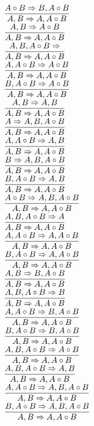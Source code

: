 \documentclass[11pt]{article}
\begin{document}
\begin{center}
\bigskip
\\$\infer{A, B\Rightarrow A, A\circ B}{A\circ B\Rightarrow B, A\circ B}$
\bigskip
\\$\infer{A, B\Rightarrow A, A\circ B}{A, B\Rightarrow A\circ B}$
\bigskip
\\$\infer{A, B\Rightarrow A, A\circ B}{A, B, A\circ B\Rightarrow }$
\bigskip
\\$\infer{A, B\Rightarrow A, A\circ B}{A, A\circ B\Rightarrow A\circ B}$
\bigskip
\\$\infer{A, B\Rightarrow A, A\circ B}{B, A\circ B\Rightarrow A\circ B}$
\bigskip
\\$\infer{A, B\Rightarrow A, A\circ B}{A, B\Rightarrow A, B}$
\bigskip
\\$\infer{A, B\Rightarrow A, A\circ B}{A\Rightarrow A, B, A\circ B}$
\bigskip
\\$\infer{A, B\Rightarrow A, A\circ B}{A, A\circ B\Rightarrow A, B}$
\bigskip
\\$\infer{A, B\Rightarrow A, A\circ B}{B\Rightarrow A, B, A\circ B}$
\bigskip
\\$\infer{A, B\Rightarrow A, A\circ B}{B, A\circ B\Rightarrow A, B}$
\bigskip
\\$\infer{A, B\Rightarrow A, A\circ B}{A\circ B\Rightarrow A, B, A\circ B}$
\bigskip
\\$\infer{A, B\Rightarrow A, A\circ B}{A, B, A\circ B\Rightarrow A}$
\bigskip
\\$\infer{A, B\Rightarrow A, A\circ B}{A, A\circ B\Rightarrow A, A\circ B}$
\bigskip
\\$\infer{A, B\Rightarrow A, A\circ B}{B, A\circ B\Rightarrow A, A\circ B}$
\bigskip
\\$\infer{A, B\Rightarrow A, A\circ B}{A, B\Rightarrow B, A\circ B}$
\bigskip
\\$\infer{A, B\Rightarrow A, A\circ B}{A, B, A\circ B\Rightarrow B}$
\bigskip
\\$\infer{A, B\Rightarrow A, A\circ B}{A, A\circ B\Rightarrow B, A\circ B}$
\bigskip
\\$\infer{A, B\Rightarrow A, A\circ B}{B, A\circ B\Rightarrow B, A\circ B}$
\bigskip
\\$\infer{A, B\Rightarrow A, A\circ B}{A, B, A\circ B\Rightarrow A\circ B}$
\bigskip
\\$\infer{A, B\Rightarrow A, A\circ B}{A, B, A\circ B\Rightarrow A, B}$
\bigskip
\\$\infer{A, B\Rightarrow A, A\circ B}{A, A\circ B\Rightarrow A, B, A\circ B}$
\bigskip
\\$\infer{A, B\Rightarrow A, A\circ B}{B, A\circ B\Rightarrow A, B, A\circ B}$

\end{center}
\end{document}
